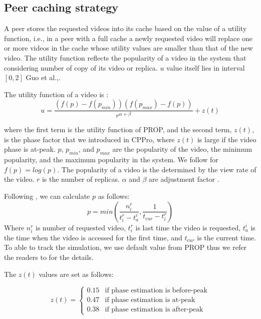 \subsection{Peer caching strategy}\label{peercachingstrategy}

A peer stores the requested videos into its cache based on the value of a utility function, i.e., in a peer with a full cache a newly requested video will replace one or more videos in the cache whose utility values are smaller than that of the new video.
The utility function reflects the popularity of a video in the system that considering number of copy of its video or replica. 
$u$ value itself lies in interval $[0,2]$ Guo et al.,\cite{1613869}.

The utility function of a video is :
\begin{equation}
u = \frac{ (f(p) - f(p_{min})) (f(p_{max}) - f(p)) }{r^{\alpha + \beta}} + z(t)
\end{equation}

where the first term is the utility function of PROP, and the second term, $z(t)$, is the phase factor that we introduced in CPPro, where $z(t)$ is large if the video phase is at-peak.
$p$, $p_{min}$, and $p_{max}$ are the popularity of the video, the minimum popularity, and the maximum popularity in the system.
We follow \cite{1613869} for $f(p) = log(p)$.
The popularity of a video is the determined by the view rate of the video.
$r$ is the number of replicas. 
$\alpha$ and $\beta$ are adjustment factor \cite{1613869}.

Following \cite{1613869}, we can calculate $p$ as follows:
\begin{equation}
p = min \left(\frac{n_i^r}{t_i^r - t_a^i}  , \frac{1}{t_{cur} - t_i^r}\right)
\end{equation}
Where $n_i^r$ is number of requested video, $t_i^r$ is last time the video is requested, $t_a^i$ is the time when the video is accessed for the first time, and $t_{cur}$ is the current time.
To able to track the simulation, we use default value from PROP thus we refer the readers to \cite{1613869} for the details.

The $z(t)$ values are set as follows:


\begin{equation}
 z(t) = 
  \begin{cases}
   0.15 & \text{if phase estimation is before-peak} \\
   0.47 & \text{if phase estimation is at-peak} \\
   0.38 & \text{if phase estimation is after-peak}
  \end{cases}
\end{equation}\label{eq:zfactor}


